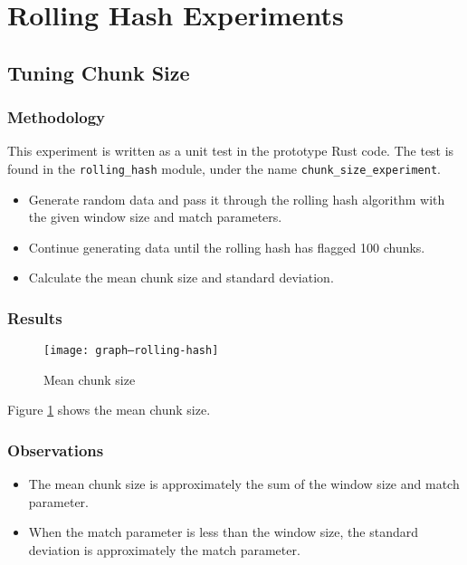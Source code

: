 \documentclass[a4paper]{article}
\begin{document}
\fi


\section{Rolling Hash Experiments}

\subsection{Tuning Chunk Size}

\subsubsection{Methodology}

This experiment is written as a unit test in the prototype Rust code. The test
is found in the \texttt{rolling\_hash} module, under the name
\texttt{chunk\_size\_experiment}.

\begin{itemize}

  \item Generate random data and pass it through the rolling hash algorithm with
    the given window size and match parameters.

  \item Continue generating data until the rolling hash has flagged 100 chunks.

  \item Calculate the mean chunk size and standard deviation.

\end{itemize}

\subsubsection{Results}

\begin{figure}[p]
  \caption{Mean chunk size}
  \label{fig:graph--rolling-hash}
  \centering
    \texttt{[image: graph--rolling-hash]}
\end{figure}

Figure \ref{fig:graph--rolling-hash} shows the mean chunk size.

\subsubsection{Observations}

\begin{itemize}

  \item The mean chunk size is approximately the sum of the window size and
    match parameter.

  \item When the match parameter is less than the window size, the standard
    deviation is approximately the match parameter.

\end{itemize}
\end{document}
